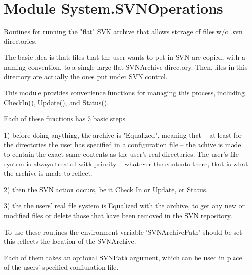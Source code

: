 %
%
%


\section{Module System.SVNOperations}

    \label{System:SVNOperations}
Routines for running the "flat" SVN archive that allows storage of files 
w/o .svn directories.

The basic idea is that:  files that the user wants to put in SVN are 
copied, with a naming convention, to a single large flat SVNArchive 
directory. Then, files in this directory are actually the ones put under 
SVN control.

This module provides convenience functions for managing this process, 
including CheckIn(), Update(), and Status().

Each of these functions has 3 basic steps:

1) before doing anything, the archive is "Equalized", meaning that -- at 
least for the directories the user has specified in a configuration file --
the achive is made to contain the exact same contents as the user's real 
directories. The user's file system is always treated with priority -- 
whatever the contents there, that is what the archive is made to reflect.

2) then the SVN action occurs, be it Check In or Update, or Status.

3) the the users' real file system is Equalized with the archive, to get 
any new or modified files or delete those that have been removed in the SVN
repository.

To use these routines the environment variable 'SVNArchivePath' should be 
set -- this reflects the location of the SVNArchive.

Each of them takes an optional SVNPath argument, which can be used in place
of the users' specified confiuration file.



